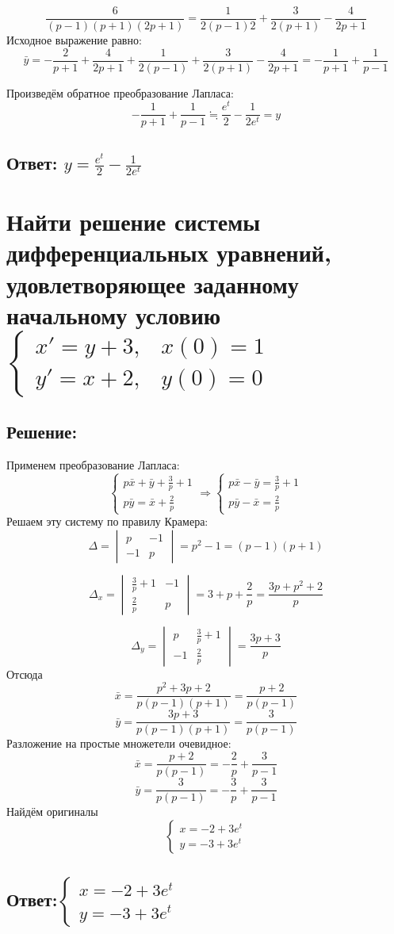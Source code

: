 \documentclass{article}
\begin{document}
	\[\frac{6}{(p-1)(p+1)(2p+1)} = \frac{1}{2(p-1)2} + \frac{3}{2(p+1)} - \frac{4}{2p+1}\]
	Исходное выражение равно:
	\[\bar{y} = -\frac{2}{p+1} + \frac{4}{2p+1} + \frac{1}{2(p-1)} + \frac{3}{2(p+1)} - \frac{4}{2p+1} = -\frac{1}{p+1}  + \frac{1}{p-1}\]
	
	Произведём  обратное преобразование Лапласа:
	\[ -\frac{1}{p+1}  + \frac{1}{p-1}  \fallingdotseq \frac{e^t}{2} - \frac{1}{2e^t} = y\]
	
	\subsection{Ответ: $y =\frac{e^t}{2} - \frac{1}{2e^t}$}
	
	\section{Найти решение системы дифференциальных уравнений, удовлетворяющее заданному начальному условию $\begin{cases}
			x'=y+3,& x(0) =1 \\
			y'=x+2,& y(0)=0
		\end{cases}$}
	\subsection{Решение:}
	Применем преобразование Лапласа:
	\[\begin{cases}
		p\bar{x} + \bar{y} + \frac{3}{p} + 1 \\
		p\bar{y} = \bar{x} + \frac{2}{p}
	\end{cases} \Rightarrow \begin{cases}
	p\bar{x} - \bar{y} = \frac{3}{p} + 1\\
	p\bar{y} - \bar{x} = \frac{2}{p}
	\end{cases}\]
	Решаем эту систему по правилу Крамера:
	\[\Delta = \begin{vmatrix}
		p & -1 \\
		-1 & p
	\end{vmatrix} = p^2 -1 = (p-1)(p+1)\]
	
	\[\Delta_x = \begin{vmatrix}
		\frac{3}{p} + 1 & -1\\
		\frac{2}{p} & p
	\end{vmatrix} = 3+p +\frac{2}{p} = \frac{3p + p^2 + 2}{p}\]
	
	\[\Delta_y =\begin{vmatrix}
		p & \frac{3}{p} + 1\\
		-1 & \frac{2}{p}
	\end{vmatrix} = \frac{3p+3}{p}\]
	Отсюда
	\[\bar{x} = \frac{p^2+3p+2}{p(p-1)(p+1)} = \frac{p+2}{p(p-1)}\]
	\[\bar{y} = \frac{3p+3}{p(p-1)(p+1)} = \frac{3}{p(p-1)}\]
	Разложение на простые множетели очевидное:
	\[\bar{x} = \frac{p+2}{p(p-1)} = -\frac{2}{p} + \frac{3}{p-1}\]
	\[\bar{y} = \frac{3}{p(p-1)} = -\frac{3}{p} + \frac{3}{p-1}\]
	Найдём оригиналы 
	\[\begin{cases}
		x = -2 + 3e^{t} \\
		y = -3 + 3e^t
	\end{cases}\]
	
	\subsection{Ответ:$\begin{cases}
			x = -2 + 3e^{t} \\
			y = -3 + 3e^t
		\end{cases}$}
\end{document}
